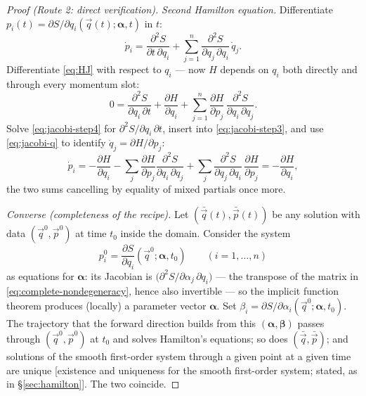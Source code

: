 \documentclass[11pt]{article}
\theoremstyle{plain}
\theoremstyle{definition}
\theoremstyle{remark}
\newcommand{\pd}[2]{\frac{\partial #1}{\partial #2}}
\newcommand{\vq}{\vec{q}}
\newcommand{\vp}{\vec{p}}
\begin{document}
\begin{proof}[Proof (Route 2: direct verification)]
\emph{Second Hamilton equation.} Differentiate
$p_i(t) = \partial S/\partial q_i(\vq(t); \boldsymbol{\alpha}, t)$
in $t$:
\begin{equation}
  \dot p_i = \frac{\partial^2 S}{\partial t\,\partial q_i}
   + \sum_{j=1}^{n}
     \frac{\partial^2 S}{\partial q_j\,\partial q_i}\,\dot q_j .
  \label{eq:jacobi-step3}
\end{equation}
Differentiate \eqref{eq:HJ} with respect to $q_i$ --- now $H$ depends
on $q_i$ both directly and through every momentum slot:
\begin{equation}
  0 = \frac{\partial^2 S}{\partial q_i\,\partial t}
    + \pd{H}{q_i}
    + \sum_{j=1}^{n}\pd{H}{p_j}\,
      \frac{\partial^2 S}{\partial q_i\,\partial q_j} .
  \label{eq:jacobi-step4}
\end{equation}
Solve \eqref{eq:jacobi-step4} for
$\partial^2 S/\partial q_i\,\partial t$, insert into
\eqref{eq:jacobi-step3}, and use \eqref{eq:jacobi-q} to identify
$\dot q_j = \partial H/\partial p_j$:
\begin{equation}
  \dot p_i
  = -\pd{H}{q_i}
    - \sum_{j}\pd{H}{p_j}\frac{\partial^2 S}{\partial q_i\,\partial q_j}
    + \sum_{j}\frac{\partial^2 S}{\partial q_j\,\partial q_i}\,
      \pd{H}{p_j}
  = -\pd{H}{q_i} ,
\end{equation}
the two sums cancelling by equality of mixed partials once more.

\emph{Converse (completeness of the recipe).} Let
$(\bar\vq(t), \bar\vp(t))$ be any solution with data
$(\vq^0, \vp^0)$ at time $t_0$ inside the domain. Consider the system
\begin{equation}
  p^0_i = \pd{S}{q_i}(\vq^0; \boldsymbol{\alpha}, t_0)
  \qquad (i = 1, \dots, n)
\end{equation}
as equations for $\boldsymbol{\alpha}$: its Jacobian is
$\bigl(\partial^2 S/\partial\alpha_j\,\partial q_i\bigr)$ --- the
transpose of the matrix in \eqref{eq:complete-nondegeneracy}, hence
also invertible --- so the implicit function theorem produces
(locally) a parameter vector $\boldsymbol{\alpha}$. Set
$\beta_i = \partial S/\partial\alpha_i(\vq^0; \boldsymbol{\alpha},
t_0)$. The trajectory that the forward direction builds from this
$(\boldsymbol{\alpha}, \boldsymbol{\beta})$ passes through
$(\vq^0, \vp^0)$ at $t_0$ and solves Hamilton's equations; so does
$(\bar\vq, \bar\vp)$; and solutions of the smooth first-order system
through a given point at a given time are unique [existence and
uniqueness for the smooth first-order system; stated, as in
\S\ref{sec:hamilton}]. The two coincide.
\end{proof}
\end{document}
